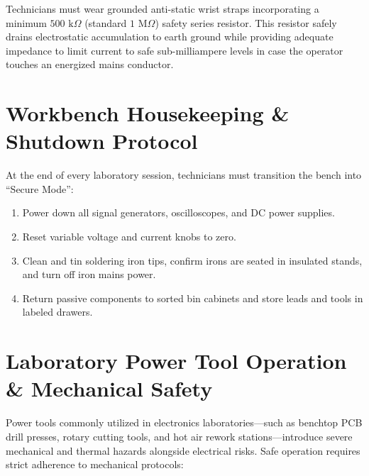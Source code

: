Technicians must wear grounded anti-static wrist straps incorporating a minimum $500\text{ k}\Omega$ (standard $1\text{ M}\Omega$) safety series resistor. This resistor safely drains electrostatic accumulation to earth ground while providing adequate impedance to limit current to safe sub-milliampere levels in case the operator touches an energized mains conductor.

\section{Workbench Housekeeping \& Shutdown Protocol}
At the end of every laboratory session, technicians must transition the bench into ``Secure Mode'':
\begin{enumerate}[leftmargin=1.5em]
    \item Power down all signal generators, oscilloscopes, and DC power supplies.
    \item Reset variable voltage and current knobs to zero.
    \item Clean and tin soldering iron tips, confirm irons are seated in insulated stands, and turn off iron mains power.
    \item Return passive components to sorted bin cabinets and store leads and tools in labeled drawers.
\end{enumerate}

\section{Laboratory Power Tool Operation \& Mechanical Safety}
Power tools commonly utilized in electronics laboratories---such as benchtop PCB drill presses, rotary cutting tools, and hot air rework stations---introduce severe mechanical and thermal hazards alongside electrical risks. Safe operation requires strict adherence to mechanical protocols:

